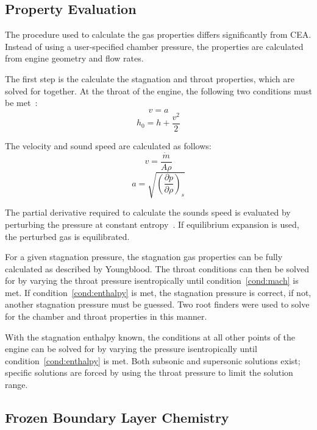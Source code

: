 \documentclass[11pt]{article}
\begin{document}
\subsection{Property Evaluation}

The procedure used to calculate the gas properties differs significantly from CEA. Instead of using a user-specified chamber pressure, the properties are calculated from engine geometry and flow rates.

The first step is the calculate the stagnation and throat properties, which are solved for together. At the throat of the engine, the following two conditions must be met~\cite{martinez-sanchez_reacting_????}:
\begin{equation}\label{cond:mach}
  v = a
\end{equation}%
\begin{equation}\label{cond:enthalpy}
  h_0 = h + \frac{v^2}{2}
\end{equation}

The velocity and sound speed are calculated as follows:
\begin{equation}
  v = \frac{\dot{m}}{A \rho}
\end{equation}%
\begin{equation}
  a = \sqrt{\left(\frac{\partial p}{\partial \rho}\right)_s}
\end{equation}

The partial derivative required to calculate the sounds speed is evaluated by perturbing the pressure at constant entropy~\cite{_cantera_????}. If equilibrium expansion is used, the perturbed gas is equilibrated.

For a given stagnation pressure, the stagnation gas properties can be fully calculated as described by Youngblood. The throat conditions can then be solved for by varying the throat pressure isentropically until condition~\ref{cond:mach} is met. If condition~\ref{cond:enthalpy} is met, the stagnation pressure is correct, if not, another stagnation pressure must be guessed. Two root finders were used to solve for the chamber and throat properties in this manner.

With the stagnation enthalpy known, the conditions at all other points of the engine can be solved for by varying the pressure isentropically until condition~\ref{cond:enthalpy} is met. Both subsonic and supersonic solutions exist; specific solutions are forced by using the throat pressure to limit the solution range.

\subsection{Frozen Boundary Layer Chemistry}
\end{document}
